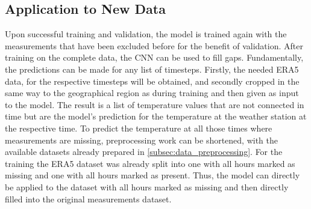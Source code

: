 \subsection{Application to New Data}
Upon successful training and validation, the model is trained again with the measurements that have been excluded before for the benefit of validation.
After training on the complete data, the CNN can be used to fill gaps.
Fundamentally, the predictions can be made for any list of timesteps. Firstly, the needed ERA5 data, for the respective timesteps will be obtained, and secondly cropped in the same way to the geographical region as during training and then given as input to the model.
The result is a list of temperature values that are not connected in time but are the model's prediction for the temperature at the weather station at the respective time.
To predict the temperature at all those times where measurements are missing, preprocessing work can be shortened, with the available datasets already prepared in \ref{subsec:data_preprocessing}.
For the training the ERA5 dataset was already split into one with all hours marked as missing and one with all hours marked as present.
Thus, the model can directly be applied to the dataset with all hours marked as missing and then directly filled into the original measurements dataset.